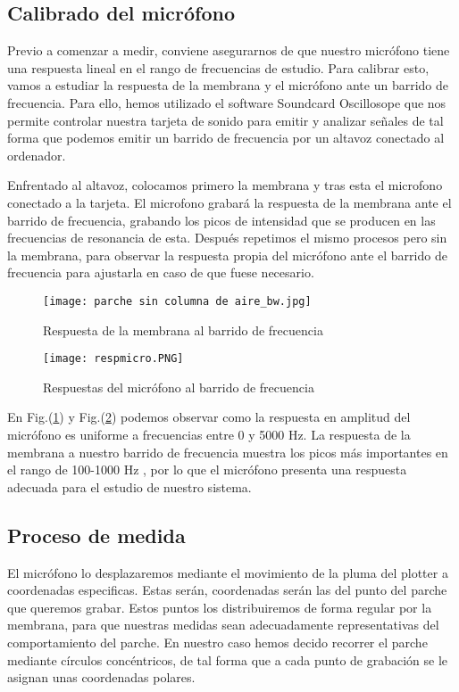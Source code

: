 \documentclass[journal, a4paper,onecolumn]{IEEEtran}
\newcommand{\figref}[1]{Fig.(\ref{#1})}
\begin{document}
\subsection{Calibrado del micrófono}

Previo a comenzar a medir, conviene asegurarnos de que nuestro micrófono tiene una respuesta lineal en el rango de frecuencias de estudio. Para calibrar esto, vamos a estudiar la respuesta de la membrana y el micrófono ante un barrido de frecuencia. Para ello, hemos utilizado el software Soundcard Oscillosope que nos permite controlar nuestra tarjeta de sonido para emitir y analizar señales de tal forma que podemos emitir un barrido de frecuencia por un altavoz conectado al ordenador. \newline 

Enfrentado al altavoz, colocamos primero la membrana y tras esta el microfono conectado a la tarjeta. El microfono grabará la respuesta de la membrana ante el barrido de frecuencia, grabando los picos de intensidad que se producen en las frecuencias de resonancia de esta. Después repetimos el mismo procesos pero sin la membrana, para observar la respuesta propia del micrófono ante el barrido de frecuencia para ajustarla en caso de que fuese necesario.


\begin{figure}[H]
\centering
 \texttt{[image: parche sin columna de aire\_bw.jpg]} 
    \caption{Respuesta de la membrana al barrido de frecuencia}
    \label{respuesta_parche}
    \end{figure}
    
    \begin{figure}[H]
    
 \centering\texttt{[image: respmicro.PNG]}
    \caption{Respuestas del micrófono al barrido de frecuencia}
    \label{respuesta_micro}
  \end{figure} 

En \figref{respuesta_parche} y \figref{respuesta_micro} podemos observar como la respuesta en amplitud del micrófono es uniforme a frecuencias entre 0 y 5000 Hz. La respuesta de la membrana a nuestro barrido de frecuencia muestra los picos más importantes en  el rango de 100-1000 Hz , por lo que el micrófono presenta una respuesta adecuada para el estudio de nuestro sistema.\newline

\subsection{Proceso de medida}
El micrófono lo desplazaremos mediante el movimiento de la pluma del plotter a coordenadas especificas. Estas serán, coordenadas serán las del punto del parche que queremos grabar. Estos puntos los distribuiremos de forma regular por la membrana, para que nuestras medidas sean adecuadamente representativas del comportamiento del parche. En nuestro caso hemos decido recorrer el parche mediante círculos concéntricos, de tal forma que a cada punto de grabación se le asignan unas coordenadas polares. \newline
\end{document}
